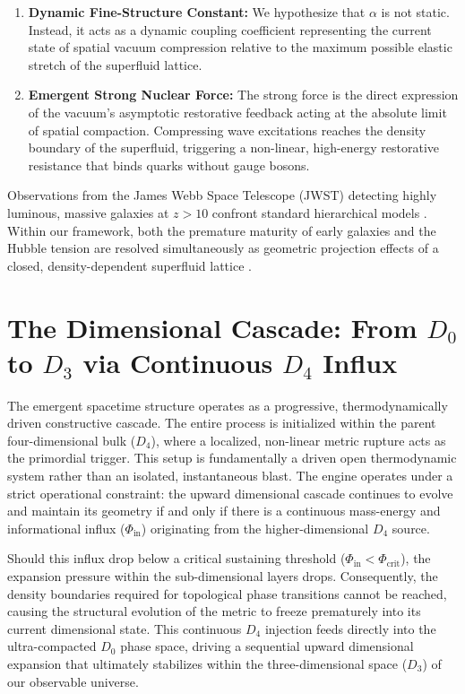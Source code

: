 \documentclass[twocolumn]{aa}
\begin{document}
\begin{enumerate}
    \item \textbf{Dynamic Fine-Structure Constant:} 
    We hypothesize that $\alpha$ is not static. Instead, it acts as a dynamic coupling coefficient representing the current state of spatial vacuum compression relative to the maximum possible elastic stretch of the superfluid lattice.
    
    \item \textbf{Emergent Strong Nuclear Force:} 
    The strong force is the direct expression of the vacuum's asymptotic restorative feedback acting at the absolute limit of spatial compaction. Compressing wave excitations reaches the density boundary of the superfluid, triggering a non-linear, high-energy restorative resistance that binds quarks without gauge bosons.
\end{enumerate}

\vspace{1em} %

Observations from the James Webb Space Telescope (JWST) detecting highly luminous, massive galaxies at $z > 10$ confront standard hierarchical models \cite{planck2020, riess2021}. Within our framework, both the premature maturity of early galaxies and the Hubble tension are resolved simultaneously as geometric projection effects of a closed, density-dependent superfluid lattice \cite{riess2021, planck2020}.


\section{The Dimensional Cascade: From $D_{0}$ to $D_{3}$ via Continuous $D_{4}$ Influx}
The emergent spacetime structure operates as a progressive, thermodynamically driven constructive cascade. The entire process is initialized within the parent four-dimensional bulk ($D_4$), where a localized, non-linear metric rupture acts as the primordial trigger. This setup is fundamentally a driven open thermodynamic system rather than an isolated, instantaneous blast. The engine operates under a strict operational constraint: the upward dimensional cascade continues to evolve and maintain its geometry if and only if there is a continuous mass-energy and informational influx ($\Phi_{\text{in}}$) originating from the higher-dimensional $D_4$ source.

Should this influx drop below a critical sustaining threshold ($\Phi_{\text{in}} < \Phi_{\text{crit}}$), the expansion pressure within the sub-dimensional layers drops. Consequently, the density boundaries required for topological phase transitions cannot be reached, causing the structural evolution of the metric to freeze prematurely into its current dimensional state. This continuous $D_4$ injection feeds directly into the ultra-compacted $D_0$ phase space, driving a sequential upward dimensional expansion that ultimately stabilizes within the three-dimensional space ($D_3$) of our observable universe.
\end{document}
